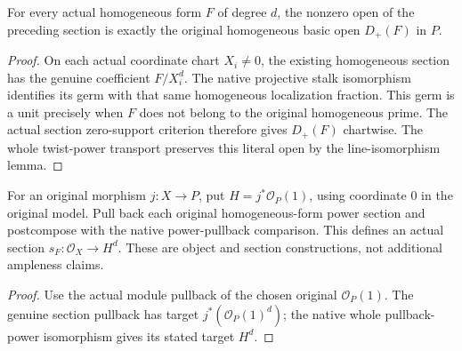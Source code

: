 \begin{lemma}
\label{lem:proj-affine-homogeneous-power-open}
\leanok
For every actual homogeneous form $F$ of degree $d$, the nonzero open
of the preceding section is exactly the original homogeneous basic
open $D_+(F)$ in $P$.
\end{lemma}
\begin{proof}
On each actual coordinate chart $X_i\ne0$, the existing homogeneous
section has the genuine coefficient $F/X_i^d$. The native projective
stalk isomorphism identifies its germ with that same homogeneous
localization fraction. This germ is a unit precisely when $F$ does
not belong to the original homogeneous prime. The actual section
zero-support criterion therefore gives $D_+(F)$ chartwise. The whole
twist-power transport preserves this literal open by the line-isomorphism lemma.
\end{proof}

\begin{definition}
\label{def:proj-affine-embedding-line-sections}
\leanok
For an original morphism $j:X\to P$, put
$H=j^*\mathcal O_P(1)$, using coordinate $0$ in the original model.
Pull back each original homogeneous-form power section and postcompose
with the native power-pullback comparison. This defines an actual
section $s_F:\mathcal O_X\to H^d$.
These are object and section constructions, not additional ampleness claims.
\end{definition}
\begin{proof}
Use the actual module pullback of the chosen original $\mathcal O_P(1)$.
The genuine section pullback has target $j^*(\mathcal O_P(1)^d)$;
the native whole pullback-power isomorphism gives its stated target $H^d$.
\end{proof}

